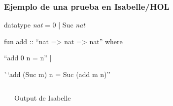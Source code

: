 \begin{frame}
\frametitle{Ejemplo de una prueba en Isabelle/HOL}

\begin{semiverbatim}
datatype \textit{nat} = 0 | Suc \textit{nat}


fun add :: ``nat => nat => nat'' where

\alert<2>{``add 0 n = n''} |

\alert<3>``add (Suc m) n = Suc (add m n)''
\end{semiverbatim}

\begin{columns}[t]
\begin{semiverbatim}
\end{semiverbatim}
\begin{block}{Output de Isabelle}
\begin{semiverbatim}

\end{semiverbatim}
\end{block}
\end{columns}


\end{frame}

